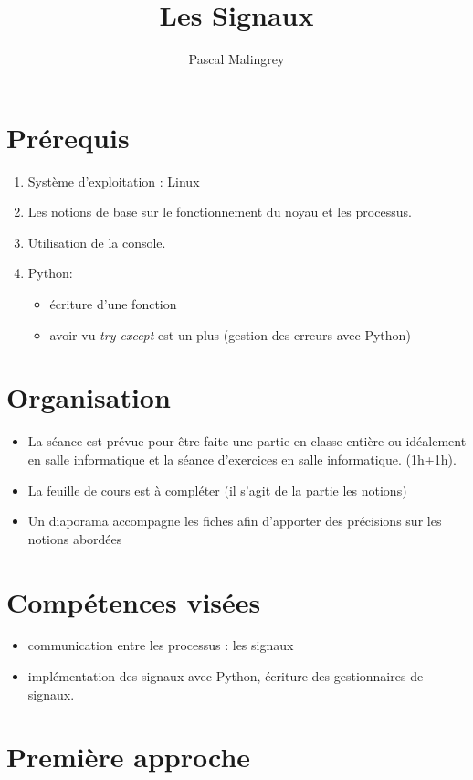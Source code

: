 \documentclass[10pt,french,A4]{article}
\title{Les Signaux}
\author{Pascal Malingrey}
\date{}
\theoremstyle{plain}
\begin{document}
  \ifProf
\section*{Prérequis}
\begin{enumerate}
    \item Système d'exploitation : Linux
    \item Les notions de base sur le fonctionnement du noyau et les processus.
    \item Utilisation de la console.
    \item Python: 
    \begin{itemize}
        \item écriture d'une fonction
        \item avoir vu \textit{try except} est un plus (gestion des erreurs avec Python)
    \end{itemize}
\end{enumerate}
\section*{Organisation}
\begin{itemize}
\item La séance est prévue pour être faite une partie en classe entière ou idéalement en salle informatique et la séance d'exercices en salle informatique. (1h+1h). 
\item La  feuille de cours est à compléter (il s'agit de la partie les notions)
\item Un diaporama accompagne les fiches afin d'apporter des précisions sur les notions abordées
\end{itemize}
\section*{Compétences visées}
\begin{itemize}
    \item communication entre les processus : les signaux
    \item implémentation des signaux avec Python, écriture des gestionnaires de signaux.
\end{itemize}

\tableofcontents

\newpage
\fi

\section{Première approche}
\end{document}
